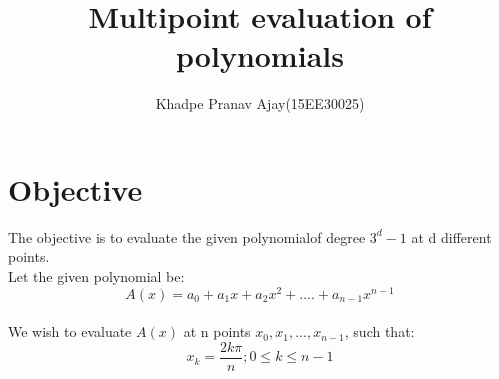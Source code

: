 \documentclass[10pt,a4paper]{article}
\author{Khadpe Pranav Ajay(15EE30025)}
\title{Multipoint evaluation of polynomials}
\begin{document}
\maketitle
\section{Objective}
The objective is to evaluate the given polynomialof degree $3^d-1$ at d different points.
\\Let the given polynomial be:
\begin{equation}A(x) = a_0 + a_1x + a_2x^2 + .... + a_{n-1}x^{n-1}
\end{equation}
\\We wish to evaluate $A(x)$ at n points $x_0,x_1,...,x_{n-1}$, such that:
\begin{equation}x_k = \frac{2k\pi}{n} ;0\leq k\leq {n-1}
\end{equation}
\end{document}
